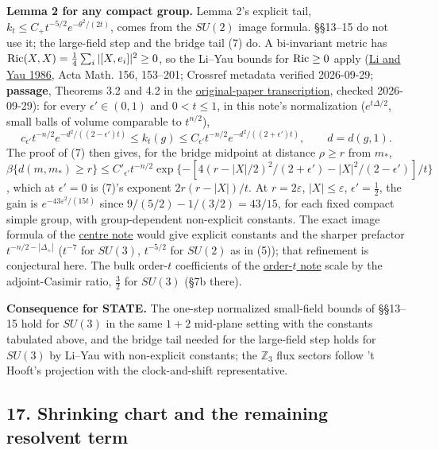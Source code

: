 \documentclass[11pt,a4paper]{article}
\begin{document}
\textbf{Lemma 2 for any compact group.} Lemma 2's explicit tail,
\(k_t\le C_+t^{-5/2}e^{-\theta^2/(2t)}\), comes from the \(SU(2)\) image
formula. §§13--15 do not use it; the large-field step and the bridge
tail (7) do. A bi-invariant metric has
\({\rm Ric}(X,X)=\frac14\sum_i|[X,e_i]|^2\ge0\), so the Li--Yau bounds
for \({\rm Ric}\ge0\) apply
(\href{https://doi.org/10.1007/BF02399203}{Li and Yau 1986}, Acta Math.
156, 153--201; Crossref metadata verified 2026-09-29; \textbf{passage},
Theorems 3.2 and 4.2 in the
\href{https://paperzz.com/doc/6929746/on-the-parabolic-kernel-of-the-schrodinger-operator---shing}{original-paper
transcription}, checked 2026-09-29): for every \(\epsilon'\in(0,1)\) and
\(0<t\le1\), in this note's normalization (\(e^{t\Delta/2}\), small
balls of volume comparable to \(t^{n/2}\)),
\[c_{\epsilon'}t^{-n/2}e^{-d^2/((2-\epsilon')t)}\le k_t(g)\le C_{\epsilon'}t^{-n/2}e^{-d^2/((2+\epsilon')t)},\qquad d=d(g,1).\]
The proof of (7) then gives, for the bridge midpoint at distance
\(\rho\ge r\) from \(m_*\),
\(\beta\{d(m,m_*)\ge r\}\le C'_{\epsilon'}t^{-n/2}\exp\{-[4(r-|X|/2)^2/(2+\epsilon')-|X|^2/(2-\epsilon')]/t\}\),
which at \(\epsilon'=0\) is (7)'s exponent \(2r(r-|X|)/t\). At
\(r=2\varepsilon\), \(|X|\le\varepsilon\), \(\epsilon'=\frac12\), the
gain is \(e^{-43\varepsilon^2/(15t)}\) since \(9/(5/2)-1/(3/2)=43/15\),
for each fixed compact simple group, with group-dependent non-explicit
constants. The exact image formula of the
\href{sun-midpoint-centre.md}{centre note} would give explicit constants
and the sharper prefactor \(t^{-n/2-|\Delta_+|}\) (\(t^{-7}\) for
\(SU(3)\), \(t^{-5/2}\) for \(SU(2)\) as in (5)); that refinement is
conjectural here. The bulk order-\(t\) coefficients of the
\href{su2-midplane-order-t.md}{order-\(t\) note} scale by the
adjoint-Casimir ratio, \(\frac32\) for \(SU(3)\) (§7b there).

\textbf{Consequence for STATE.} The one-step normalized small-field
bounds of §§13--15 hold for \(SU(3)\) in the same \(1+2\) mid-plane
setting with the constants tabulated above, and the bridge tail needed
for the large-field step holds for \(SU(3)\) by Li--Yau with
non-explicit constants; the \(\mathbb Z_3\) flux sectors follow 't
Hooft's projection with the clock-and-shift representative.

\hypertarget{shrinking-chart-and-the-remaining-resolvent-term}{%
\subsection{17. Shrinking chart and the remaining resolvent
term}\label{shrinking-chart-and-the-remaining-resolvent-term}}
\end{document}
